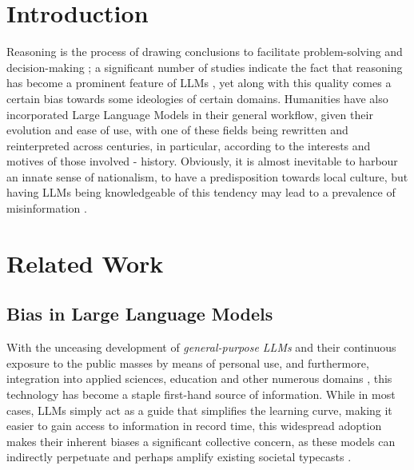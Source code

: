 \documentclass[11pt]{article}
\begin{document}
\section{Introduction}
Reasoning is the process of drawing conclusions to facilitate problem-solving and decision-making \cite{leighton2003}; a significant number of studies indicate the fact that reasoning has become a prominent feature of LLMs \cite{chandra2025}, yet along with this quality comes a certain bias towards some ideologies of certain domains. Humanities have also incorporated Large Language Models in their general workflow, given their evolution and ease of use, with one of these fields being rewritten and reinterpreted across centuries, in particular, according to the interests and motives of those involved - history. Obviously, it is almost inevitable to harbour an innate sense of nationalism, to have a predisposition towards local culture, but having LLMs being knowledgeable of this tendency may lead to a prevalence of misinformation \cite{cichocka2020}. 


\section{Related Work}
\subsection{Bias in Large Language Models}
With the unceasing development of \textit{general-purpose LLMs} and their continuous exposure to the public masses by means of personal use, and furthermore, integration into applied sciences, education and other numerous domains \cite{guo2024}, this technology has become a staple first-hand source of information. While in most cases, LLMs simply act as a guide that simplifies the learning curve, making it easier to gain access to information in record time, this widespread adoption makes their inherent biases a significant collective concern, as these models can indirectly perpetuate and perhaps amplify existing societal typecasts \cite{kumar2024}.
\end{document}
